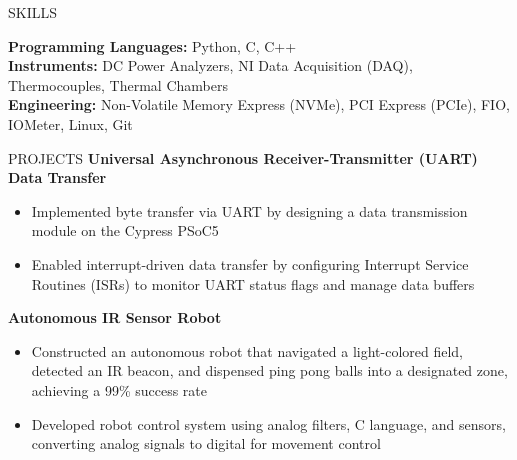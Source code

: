 \documentclass{resume} %
\begin{document}
\begin{rSection}{SKILLS}


\textbf{Programming Languages: }Python, C, C++ \\
\textbf{Instruments: }DC Power Analyzers, NI Data Acquisition (DAQ), Thermocouples, Thermal Chambers\\
\textbf{Engineering: }Non-Volatile Memory Express (NVMe), PCI Express (PCIe), FIO, IOMeter, Linux, Git 
\end{rSection}


\begin{rSection}{PROJECTS}
\textbf{Universal Asynchronous Receiver-Transmitter (UART) Data Transfer} \hfill {}
  \begin{itemize}[left=1em]
  \itemsep -0.5em \vspace{-0.5em}
    \item Implemented byte transfer via UART by designing a data transmission module on the Cypress PSoC5
    \item Enabled interrupt-driven data transfer by configuring Interrupt Service Routines (ISRs) to monitor UART status flags and manage data buffers
  \end{itemize}


 \textbf{Autonomous IR Sensor Robot} \hfill {}
  \begin{itemize}[left=1em]
  \itemsep -0.5em \vspace{-0.5em}
    \item Constructed an autonomous robot that navigated a light-colored field, detected an IR beacon, and dispensed ping pong balls into a designated zone, achieving a 99\% success rate
    \item Developed robot control system using analog filters, C language, and sensors, converting analog signals to digital for movement control
  \end{itemize}


\end{rSection}
\end{document}
